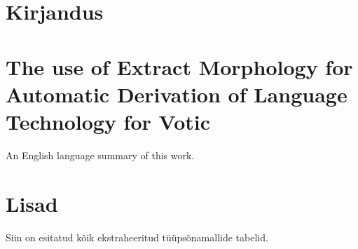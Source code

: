 \documentclass[12pt,a4paper]{article}
\begin{document}
\glsaddall
\small{
  \printglossary[title={},toctitle={}]
}








\newpage
\section{Kirjandus}
\label{sec:kirjandus}
{
  \renewcommand*{\bibfont}{\small}
  \printbibliography[heading=none]
}







\newpage
\section{The use of Extract Morphology for Automatic Derivation of Language Technology for Votic}

An English language summary of this work.







\newpage
\section{Lisad}

Siin on esitatud kõik ekstraheeritud tüüpsõnamallide tabelid.

%
\end{document}
